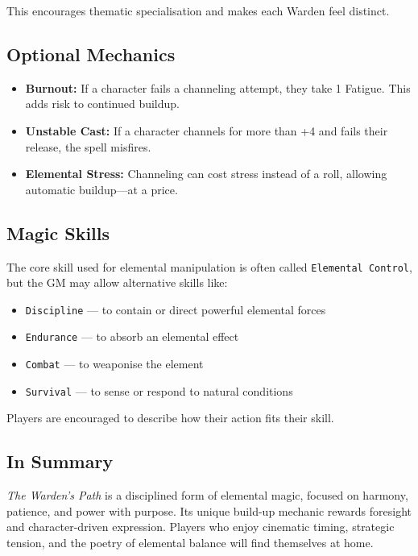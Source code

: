 This encourages thematic specialisation and makes each Warden feel distinct.

\subsection{Optional Mechanics}

\begin{itemize}
    \item \textbf{Burnout:} If a character fails a channeling attempt, they take 1 Fatigue. This adds risk to continued buildup.
    \item \textbf{Unstable Cast:} If a character channels for more than +4 and fails their release, the spell misfires.
    \item \textbf{Elemental Stress:} Channeling can cost stress instead of a roll, allowing automatic buildup—at a price.
\end{itemize}

\subsection{Magic Skills}

The core skill used for elemental manipulation is often called \texttt{Elemental Control}, but the GM may allow alternative skills like:

\begin{itemize}
    \item \texttt{Discipline} — to contain or direct powerful elemental forces  
    \item \texttt{Endurance} — to absorb an elemental effect  
    \item \texttt{Combat} — to weaponise the element  
    \item \texttt{Survival} — to sense or respond to natural conditions  
\end{itemize}

Players are encouraged to describe how their action fits their skill.

\subsection{In Summary}

\textit{The Warden’s Path} is a disciplined form of elemental magic, focused on harmony, patience, and power with purpose. Its unique build-up mechanic rewards foresight and character-driven expression. Players who enjoy cinematic timing, strategic tension, and the poetry of elemental balance will find themselves at home.
